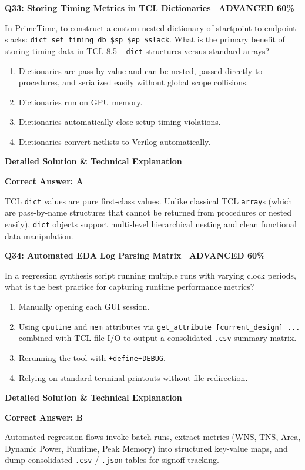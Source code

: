 \documentclass[11pt,a4paper]{article}
\newcommand{\badgeadv}{{\color{white}\colorbox{advred}{\bfseries\sffamily\tiny\ ADVANCED 60\%\ }}}
\newenvironment{qbox}[2]{%
  \begin{mdframed}[style=qstyle]%
  {\bfseries\sffamily\color{primaryblue}#1 \hfill #2}\par\vspace{2pt}%
}{%
  \end{mdframed}%
}
\newenvironment{ansbox}{%
  \begin{mdframed}[style=ansstyle]%
  {\bfseries\sffamily\color{ansgreen}\small Detailed Solution \& Technical Explanation}\par\vspace{2pt}\small%
}{%
  \end{mdframed}%
}
\begin{document}
\begin{qbox}{Q33: Storing Timing Metrics in TCL Dictionaries}{\badgeadv}
In PrimeTime, to construct a custom nested dictionary of startpoint-to-endpoint slacks: \texttt{dict set timing\_db \$sp \$ep \$slack}. What is the primary benefit of storing timing data in TCL 8.5+ \texttt{dict} structures versus standard arrays?
\begin{enumerate}[label=\textbf{\Alph*.}]
  \item Dictionaries are pass-by-value and can be nested, passed directly to procedures, and serialized easily without global scope collisions.
  \item Dictionaries run on GPU memory.
  \item Dictionaries automatically close setup timing violations.
  \item Dictionaries convert netlists to Verilog automatically.
\end{enumerate}
\end{qbox}
\begin{ansbox}
\textbf{Correct Answer: A}

TCL \texttt{dict} values are pure first-class values. Unlike classical TCL \texttt{array}s (which are pass-by-name structures that cannot be returned from procedures or nested easily), \texttt{dict} objects support multi-level hierarchical nesting and clean functional data manipulation.
\end{ansbox}

\begin{qbox}{Q34: Automated EDA Log Parsing Matrix}{\badgeadv}
In a regression synthesis script running multiple runs with varying clock periods, what is the best practice for capturing runtime performance metrics?
\begin{enumerate}[label=\textbf{\Alph*.}]
  \item Manually opening each GUI session.
  \item Using \texttt{cputime} and \texttt{mem} attributes via \texttt{get\_attribute [current\_design] ...} combined with TCL file I/O to output a consolidated \texttt{.csv} summary matrix.
  \item Rerunning the tool with \texttt{+define+DEBUG}.
  \item Relying on standard terminal printouts without file redirection.
\end{enumerate}
\end{qbox}
\begin{ansbox}
\textbf{Correct Answer: B}

Automated regression flows invoke batch runs, extract metrics (WNS, TNS, Area, Dynamic Power, Runtime, Peak Memory) into structured key-value maps, and dump consolidated \texttt{.csv} / \texttt{.json} tables for signoff tracking.
\end{ansbox}
\end{document}
